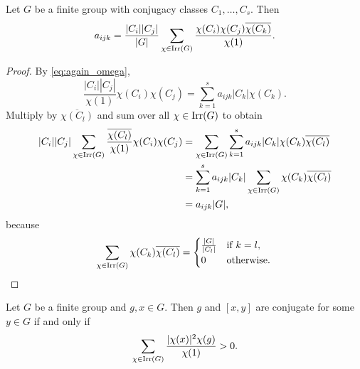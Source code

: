 \begin{theorem}[Burnside]
    Let $G$ be a finite group with conjugacy classes $C_1,\dots,C_s$. 
    Then
    \[
    a_{ijk}
    =\frac{|C_i||C_j|}{|G|}
    \sum_{\chi\in\operatorname{Irr}(G)}\frac{\chi(C_i)\chi(C_j)\overline{\chi(C_k)}}{\chi(1)}.
    \]
\end{theorem}

\begin{proof}
    By \eqref{eq:again_omega}, 
    \[
    \frac{|C_i||C_j|}{\chi(1)}\chi(C_i)\chi(C_j)
    =\sum_{k=1}^sa_{ijk}|C_k|\chi(C_k).
    \]
    Multiply by $\overline{\chi(C_l)}$ and sum over all
    $\chi\in\operatorname{Irr}(G)$ to obtain 
    \begin{align*}
    |C_i||C_j|\sum_{\chi\in\operatorname{Irr}(G)}\frac{\overline{\chi(C_l)}}{\chi(1)}\chi(C_i)\chi(C_j)
    &=\sum_{\chi\in\operatorname{Irr}(G)}\sum_{k=1}^sa_{ijk}|C_k|\chi(C_k)\overline{\chi(C_l)}\\
    &=\sum_{k=1}^sa_{ijk}|C_k|\sum_{\chi\in\operatorname{Irr}(G)}\chi(C_k)\overline{\chi(C_l)}\\
    &=a_{ijk}|G|,
    \end{align*}
    because 
    \[
    \sum_{\chi\in\operatorname{Irr}(G)}\chi(C_k)\overline{\chi(C_l)}=\begin{cases}
        \frac{|G|}{|C_l|} & \text{if $k=l$},\\
        0 & \text{otherwise}.
        \end{cases}\qedhere
    \]
\end{proof}

\begin{theorem}[Burnside]
    Let $G$ be a finite group and $g,x\in G$. Then
    $g$ and $[x,y]$ are conjugate for some $y\in G$ if and only if
    \[
    \sum_{\chi\in\operatorname{Irr}(G)}\frac{|\chi(x)|^2\chi(g)}{\chi(1)}>0.
    \]
\end{theorem}


